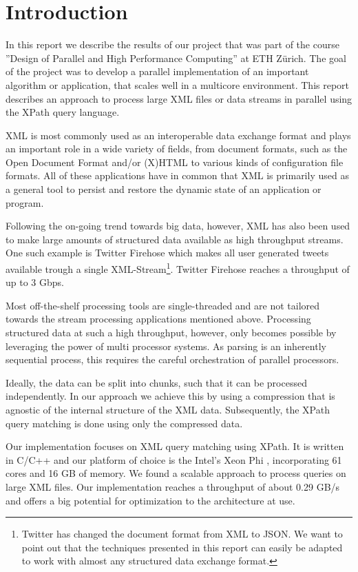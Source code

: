 \section{Introduction}\label{sec:intro}

In this report we describe the results of our project that was part of the
course ''Design of Parallel and High Performance Computing'' at ETH Z\"urich.
The goal of the project was to develop a parallel implementation of an important
algorithm or application, that scales well in a multicore environment. This
report describes an approach to process large XML files or data streams in
parallel using the XPath query language.

XML is most commonly used as an interoperable data exchange format and plays 
an important role in a wide variety of fields, from document formats, such as the 
Open Document Format  and/or (X)HTML  to various kinds of
configuration file formats. All of these applications have in common that XML is
primarily used as a general tool to persist and restore the dynamic state of an
application or program.

Following the on-going trend towards big data, however, XML has also been used
to make large amounts of structured data available as high throughput streams.
One such example is Twitter Firehose which makes all user generated tweets
available trough a single XML-Stream\footnote{Twitter has changed the document
format from XML to JSON. We want to point out that the techniques presented in this
report can easily be adapted to work with almost any structured data exchange
format.}. Twitter Firehose reaches a throughput of up to 3 Gbps.

Most off-the-shelf processing tools are single-threaded and are not tailored towards 
the stream processing applications mentioned above. Processing structured data at 
such a high throughput, however, only becomes possible by leveraging the power of 
multi processor systems. As parsing is an inherently sequential process, this requires 
the careful orchestration of parallel processors.

Ideally, the data can be split into chunks, such that it can be processed independently.
In our approach we achieve this by using a compression that is agnostic of the
internal structure of the XML data. Subsequently, the XPath query matching is done 
using only the compressed data.

Our implementation focuses on XML query matching using XPath. It is written in
C/C++ and our platform of choice is the Intel's Xeon Phi \cite{IntelXeon}, incorporating 61 cores
and 16 GB of memory. We found a scalable approach to process queries on large
XML files. Our implementation reaches a throughput of about 0.29 GB/s and offers
a big potential for optimization to the architecture at use. 

